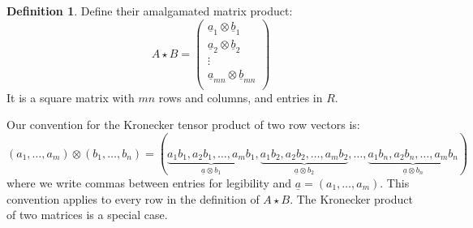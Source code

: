 \documentclass[a4paper,10pt]{amsart}
\theoremstyle{definition}
\newtheorem{defn}[thm]{Definition}
\theoremstyle{remark}
\numberwithin{equation}{section}
\newcommand{\0}{\color{blue}{\mathsf{0}}}
\begin{document}
  \begin{defn} Define their  amalgamated matrix product:
 \[  
 A \star B =     \begin{pmatrix} \underline{a}_1 \otimes   \underline{b}_1 \\ 
  \underline{a}_2 \otimes \underline{b}_2 \\ 
      \vdots \\
 \underline{a}_{mn} \otimes  \underline{b}_{mn} \\ 
 \end{pmatrix}  \]
 It is a square matrix with  $mn$ rows and columns, and entries in $R$.  
 \end{defn} 
 Our convention for the Kronecker tensor product of two row vectors is:
 \[  (a_1  ,  \ldots ,  a_m) \otimes (b_1,   \ldots  , b_n)  =   
   ( \underbrace{a_1 b_1  ,  a_2 b_1  ,  \ldots ,   a_m b_1}_{\underline{a} \otimes b_1} , \underbrace{a_1 b_2 , a_2 b_2 , \ldots, a_m b_2}_{\underline{a} \otimes b_2}  , \ldots ,   \underbrace{a_1 b_n , a_2 b_n , \ldots, a_m b_n}_{\underline{a} \otimes b_n}   )  \]
 where  we write commas between entries  for  legibility and $\underline{a} = (a_1,\ldots, a_m)$.  This convention applies to every row in the definition of $A \star B$.  The  Kronecker  product of two matrices is a special case.
 
\end{document}
